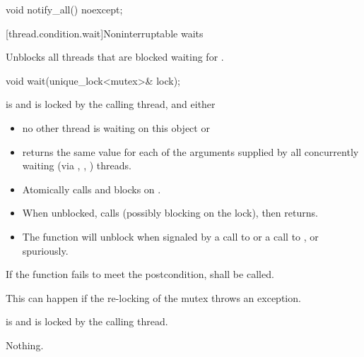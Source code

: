 %
\begin{itemdecl}
void notify_all() noexcept;
\end{itemdecl}


{\color{insertcolor}
[thread.condition.wait]{Noninterruptable waits}
}


\begin{itemdescr}
\pnum\effects Unblocks all threads that are blocked waiting for .
\end{itemdescr}

%
\begin{itemdecl}
void wait(unique_lock<mutex>& lock);
\end{itemdecl}
\begin{itemdescr}
 \pnum \requires {} is  and 
        is locked by the calling thread, and either
        \begin{itemize}
         \item no other thread is waiting on this  object or
         \item {} returns the same value for each of the 
                arguments supplied by all concurrently waiting (via ,
                , ) threads.
        \end{itemize}

 \pnum\effects
 \begin{itemize}
        \item Atomically calls  and blocks on .
        \item When unblocked, calls  (possibly blocking on the lock), then returns.
        \item The function will unblock when signaled by a call to 
              or a call to , or spuriously.
 \end{itemize}

 \pnum \remarks
        If the function fails to meet the postcondition, 
        shall be called.
        \begin{note} This can happen if the re-locking of the mutex throws an exception. \end{note}
 
 \pnum \postconditions {} is  and 
        is locked by the calling thread.

 \pnum\throws Nothing.
\end{itemdescr}


